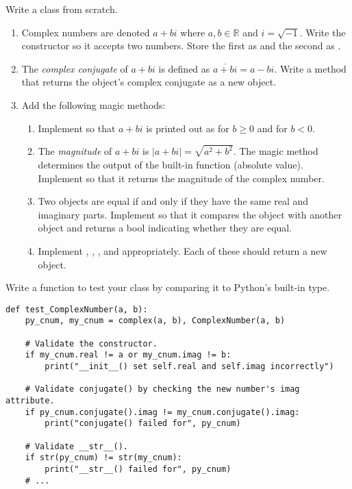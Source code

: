 \begin{problem} %
Write a  class from scratch.
\begin{enumerate}
\item Complex numbers are denoted $a+bi$ where $a,b\in\mathbb{R}$ and $i=\sqrt{-1}$.
Write the constructor so it accepts two numbers.
Store the first as  and the second as .
\item The \emph{complex conjugate} of $a+bi$ is defined as $\overline{a+bi} = a - bi$.
Write a  method that returns the object's complex conjugate as a new  object.
\item Add the following magic methods:
\begin{enumerate}
\item Implement  so that $a+bi$ is printed out as  for $b \ge 0$ and  for $b < 0$.
\item The \emph{magnitude} of $a+bi$ is $|a+bi| = \sqrt{a^2+b^2}$.
The  magic method determines the output of the built-in  function (absolute value).
Implement  so that it returns the magnitude of the complex number.
\item Two  objects are equal if and only if they have the same real and imaginary parts. Implement  so that it compares the  object with another  object and returns a bool indicating whether they are equal. 
\item Implement , , , and  appropriately.
Each of these should return a new  object.
\end{enumerate}
\end{enumerate}
Write a function to test your class by comparing it to Python's built-in  type.
\begin{lstlisting}
def test_ComplexNumber(a, b):
    py_cnum, my_cnum = complex(a, b), ComplexNumber(a, b)

    # Validate the constructor.
    if my_cnum.real != a or my_cnum.imag != b:
        print("__init__() set self.real and self.imag incorrectly")

    # Validate conjugate() by checking the new number's imag attribute.
    if py_cnum.conjugate().imag != my_cnum.conjugate().imag:
        print("conjugate() failed for", py_cnum)

    # Validate __str__().
    if str(py_cnum) != str(my_cnum):
        print("__str__() failed for", py_cnum)
    # ...
\end{lstlisting}
\end{problem}

